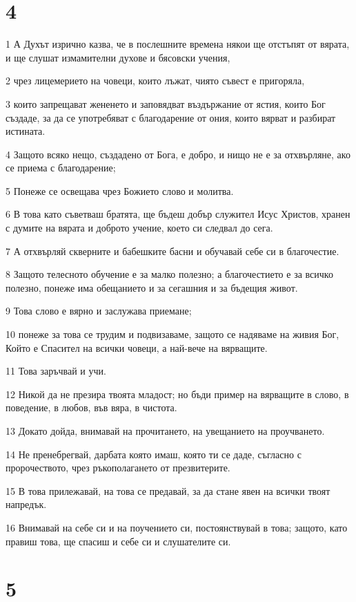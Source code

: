 \chapter{4}

\par 1 А Духът изрично казва, че в послешните времена някои ще отстъпят от вярата, и ще слушат измамителни духове и бясовски учения,
\par 2 чрез лицемерието на човеци, които лъжат, чиято съвест е пригоряла,
\par 3 които запрещават жененето и заповядват въздържание от ястия, които Бог създаде, за да се употребяват с благодарение от ония, които вярват и разбират истината.
\par 4 Защото всяко нещо, създадено от Бога, е добро, и нищо не е за отхвърляне, ако се приема с благодарение;
\par 5 Понеже се освещава чрез Божието слово и молитва.
\par 6 В това като съветваш братята, ще бъдеш добър служител Исус Христов, хранен с думите на вярата и доброто учение, което си следвал до сега.
\par 7 А отхвърляй скверните и бабешките басни и обучавай себе си в благочестие.
\par 8 Защото телесното обучение е за малко полезно; а благочестието е за всичко полезно, понеже има обещанието и за сегашния и за бъдещия живот.
\par 9 Това слово е вярно и заслужава приемане;
\par 10 понеже за това се трудим и подвизаваме, защото се надяваме на живия Бог, Който е Спасител на всички човеци, а най-вече на вярващите.
\par 11 Това заръчвай и учи.
\par 12 Никой да не презира твоята младост; но бъди пример на вярващите в слово, в поведение, в любов, във вяра, в чистота.
\par 13 Докато дойда, внимавай на прочитането, на увещанието на проучването.
\par 14 Не пренебрегвай, дарбата която имаш, която ти се даде, съгласно с пророчеството, чрез ръкополагането от презвитерите.
\par 15 В това прилежавай, на това се предавай, за да стане явен на всички твоят напредък.
\par 16 Внимавай на себе си и на поучението си, постоянствувай в това; защото, като правиш това, ще спасиш и себе си и слушателите си.

\chapter{5}

